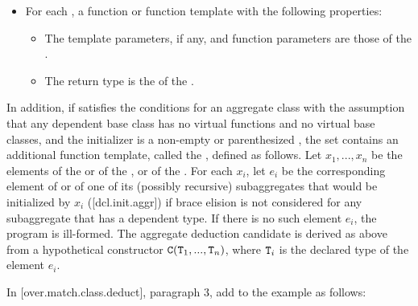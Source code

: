 \begin{adjustwidth}{0.9cm}{0.9cm}
\begin{itemize}
\item For each , a function or function template with the following properties:
\begin{itemize}
\item The template parameters, if any, and function parameters are those of the .
\item The return type is the  of the .
\end{itemize}
\end{itemize}

\begin{addedblock}
In addition, if  satisfies the conditions for an aggregate class with the assumption that any dependent base class has no virtual functions and no virtual base classes, and the initializer is a non-empty  or parenthesized , the set contains an additional function template, called the , defined as follows. Let $x_1, ..., x_n$ be the elements of the  or  of the , or of the . For each $x_i$, let $e_i$ be the corresponding element of  or of one of its (possibly recursive) subaggregates that would be initialized by $x_i$ ([dcl.init.aggr]) if brace elision is not considered for any subaggregate that has a dependent type. If there is no such element $e_i$, the program is ill-formed. The aggregate deduction candidate is derived as above from a hypothetical constructor $\texttt{C}(\texttt{T}_1, ..., \texttt{T}_n)$, where $\texttt{T}_i$ is the declared type of the element $e_i$.
\end{addedblock}
\end{adjustwidth}

In [over.match.class.deduct], paragraph 3, add to the example as follows:


